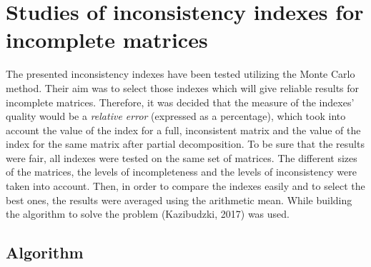 \chapter{Studies of inconsistency indexes for incomplete matrices}
\label{sec:studiesOfInconsistencyIndexesForIncompleteMatrices}

The presented inconsistency indexes have been tested utilizing the Monte Carlo method. Their aim was to select those indexes which will give reliable results for incomplete matrices. Therefore, it was decided that the measure of the indexes' quality would be a \textit{relative error} (expressed as a percentage), which took into account the value of the index for a full, inconsistent matrix and the value of the index for the same matrix after partial decomposition. To be sure that the results were fair, all indexes were tested on the same set of matrices. The different sizes of the matrices, the levels of incompleteness and the levels of inconsistency were taken into account. Then, in order to compare the indexes easily and to select the best ones, the results were averaged using the arithmetic mean. While building the algorithm to solve the problem (Kazibudzki, 2017) was used.


\section{Algorithm}
